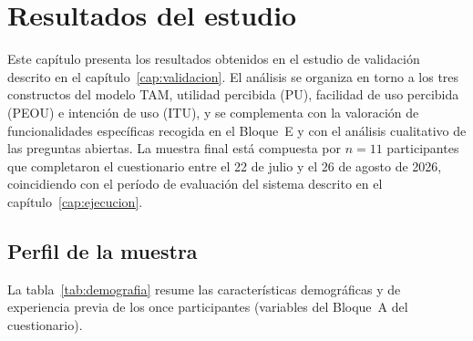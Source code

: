 
\chapter{Resultados del estudio}\label{cap:resultados}

Este capítulo presenta los resultados obtenidos en el estudio de validación descrito en el capítulo~\ref{cap:validacion}. El análisis se organiza en torno a los tres constructos del modelo TAM, utilidad percibida (PU), facilidad de uso percibida (PEOU) e intención de uso (ITU), y se complementa con la valoración de funcionalidades específicas recogida en el Bloque~E y con el análisis cualitativo de las preguntas abiertas. La muestra final está compuesta por $n = 11$ participantes que completaron el cuestionario entre el 22 de julio y el 26 de agosto de 2026, coincidiendo con el período de evaluación del sistema descrito en el capítulo~\ref{cap:ejecucion}.

\section{Perfil de la muestra}\label{sec:perfil-muestra}

La tabla~\ref{tab:demografia} resume las características demográficas y de experiencia previa de los once participantes (variables del Bloque~A del cuestionario).

